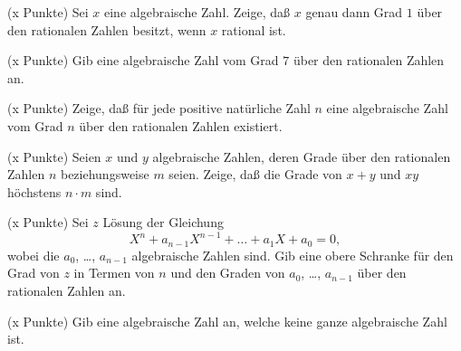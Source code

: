 \documentclass{algsheet}
\author{Dipl.-Math.~Arturo Mancino}
\date{15.~Dezember 2010}
\begin{document}
                \maketitle






\begin{exercise}(x Punkte)\newline
    Sei \(x\) eine algebraische Zahl. Zeige, daß \(x\) genau dann Grad \(1\)
    über den rationalen Zahlen besitzt, wenn \(x\) rational ist. 
\end{exercise}

\begin{exercise}(x Punkte)\newline
    Gib eine algebraische Zahl vom Grad \(7\) über den rationalen Zahlen
    an.
\end{exercise}

\begin{exercise}(x Punkte)\newline
    Zeige, daß für jede positive natürliche Zahl \(n\) eine algebraische Zahl
    vom Grad \(n\) über den rationalen Zahlen existiert.
\end{exercise}

\begin{exercise}(x Punkte)\newline
    Seien \(x\) und \(y\) algebraische Zahlen, deren Grade über
    den rationalen Zahlen \(n\) beziehungsweise \(m\) seien. Zeige, daß
    die Grade von \(x + y\) und \(x y\) höchstens \(n \cdot m\) sind.
\end{exercise}


\begin{exercise}(x Punkte)\newline
    Sei \(z\) Lösung der Gleichung
    \begin{equation}
        X^n + a_{n - 1} X^{n - 1} + \dots + a_1 X + a_0 = 0,
    \end{equation}
    wobei die \(a_0\), \dots, \(a_{n - 1}\) algebraische Zahlen sind.
    Gib eine obere Schranke für den Grad von \(z\) in Termen von
    \(n\) und den Graden von \(a_0\), \dots, \(a_{n - 1}\) über den rationalen
    Zahlen an.
\end{exercise}



\begin{exercise}(x Punkte)\newline
    Gib eine algebraische Zahl an, welche keine ganze algebraische Zahl ist.
\end{exercise}
\end{document}
